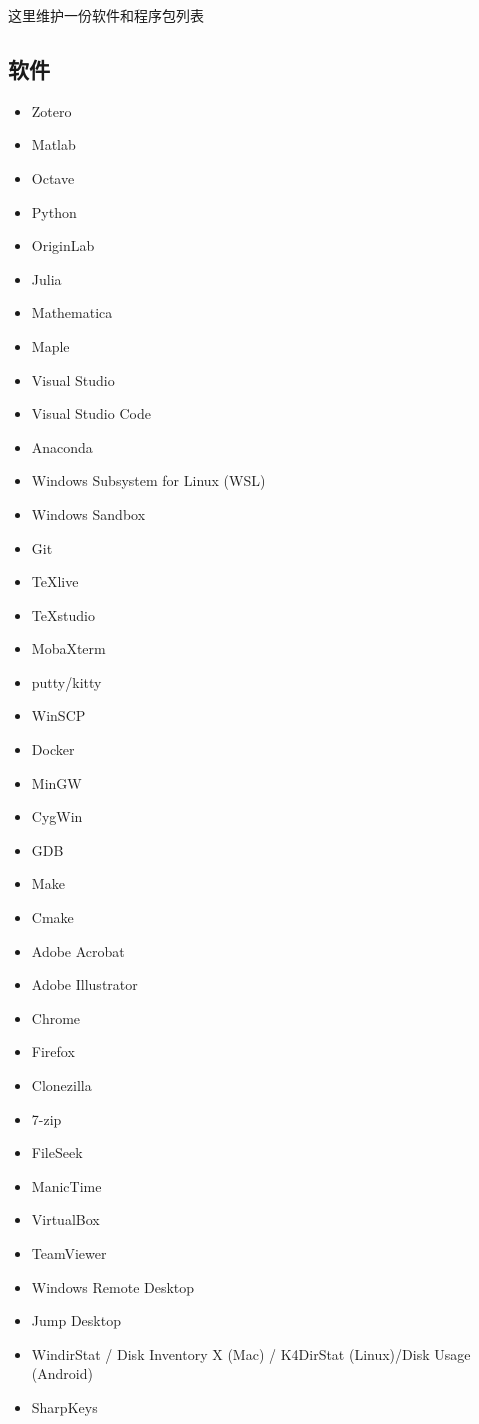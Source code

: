 
这里维护一份软件和程序包列表

\subsection{软件}
\begin{itemize}
\item Zotero
\item Matlab
\item Octave
\item Python
\item OriginLab
\item Julia
\item Mathematica
\item Maple
\item Visual Studio
\item Visual Studio Code
\item Anaconda
\item Windows Subsystem for Linux (WSL)
\item Windows Sandbox
\item Git
\item TeXlive
\item TeXstudio
\item MobaXterm
\item putty/kitty
\item WinSCP
\item Docker
\item MinGW
\item CygWin
\item GDB
\item Make
\item Cmake
\item Adobe Acrobat
\item Adobe Illustrator
\item Chrome
\item Firefox
\item Clonezilla
\item 7-zip
\item FileSeek
\item ManicTime
\item VirtualBox
\item TeamViewer
\item Windows Remote Desktop
\item Jump Desktop
\item WindirStat / Disk Inventory X (Mac) / K4DirStat (Linux)/Disk Usage (Android)
\item SharpKeys

\end{itemize}
